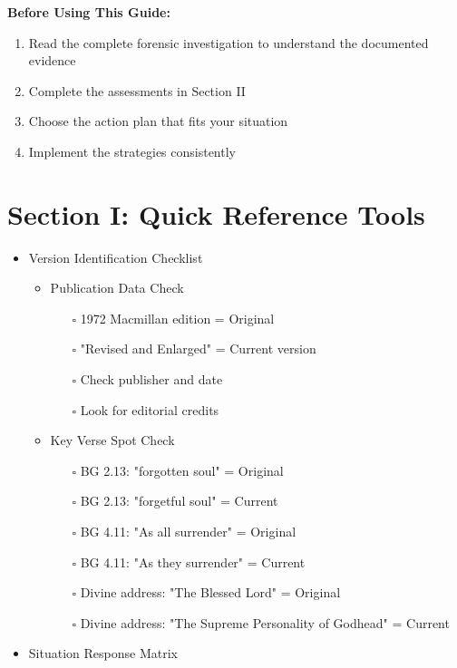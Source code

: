 \documentclass[11pt,twoside]{book}
\begin{document}
\textbf{\textbf{Before Using This Guide:}}
\begin{enumerate}
\item Read the complete forensic investigation to understand the documented evidence
\item Complete the assessments in Section II
\item Choose the action plan that fits your situation
\item Implement the strategies consistently
\end{enumerate}
\section*{Section I: Quick Reference Tools}
\label{sec:org5078511}

\begin{itemize}
\item Version Identification Checklist
\label{sec:org25f602a}

\begin{itemize}
\item Publication Data Check
\label{sec:org520cf37}
\begin{itemize}
\item[{$\square$}] 1972 Macmillan edition = Original
\item[{$\square$}] "Revised and Enlarged" = Current version
\item[{$\square$}] Check publisher and date
\item[{$\square$}] Look for editorial credits
\end{itemize}
\item Key Verse Spot Check
\label{sec:orgb396e73}
\begin{itemize}
\item[{$\square$}] BG 2.13: "forgotten soul" = Original
\item[{$\square$}] BG 2.13: "forgetful soul" = Current
\item[{$\square$}] BG 4.11: "As all surrender" = Original
\item[{$\square$}] BG 4.11: "As they surrender" = Current
\item[{$\square$}] Divine address: "The Blessed Lord" = Original
\item[{$\square$}] Divine address: "The Supreme Personality of Godhead" = Current
\end{itemize}
\end{itemize}
\item Situation Response Matrix
\label{sec:org3ef3035}


\end{itemize}
\end{document}
